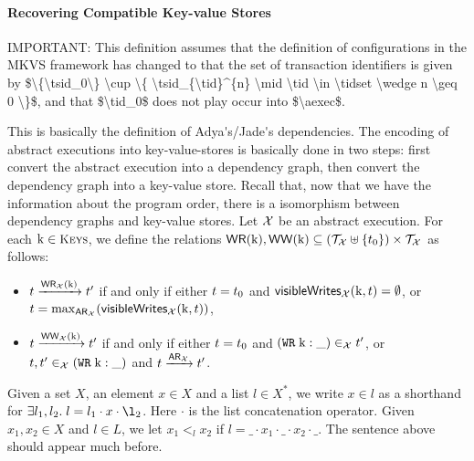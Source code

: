 \paragraph{Recovering Compatible Key-value Stores}
\ac{IMPORTANT: This definition assumes that the definition of configurations in the MKVS framework has changed 
to that the set of transaction identifiers is given by $\{\tsid_0\} \cup \{ \tsid_{\tid}^{n} \mid \tid \in \tidset \wedge n \geq 0 \}$, 
and that $\tid_0$ does not play occur into $\aexec$.}
%
\begin{definition}
\ac{This is basically the definition of Adya's/Jade's dependencies. The encoding 
of abstract executions into key-value-stores is basically done in two steps: first 
convert the abstract execution into a dependency graph, then convert the dependency graph 
into a key-value store. Recall that, now that we have the information about the program order, 
there is a isomorphism between dependency graphs and key-value stores.}
Let $\aexec$ be an abstract execution. For each $\key{k} \in \Addr$, 
we define the relations ${\mathsf{WR}}(\mathrm{k}), {\mathsf{WW}}(\mathrm{k}) \subseteq (\mathcal{T}_{\mathcal{X}} \uplus \{t_0\}) \times 
\mathcal{T}_{\mathcal{X}}$ as follows: 
\begin{itemize}
\item $t \xrightarrow{{\mathsf{WR}}_{\mathcal{X}}(\mathrm{k})} t'$ if and only if either $t = t_0$ and 
$\mathsf{visibleWrites}_{\mathcal{X}}(\mathrm{k}, t) = \emptyset$, or 
$t = \max_{{\sf{AR}}_{\mathcal{X}}}(\mathsf{visibleWrites}_{\mathcal{X}}(\mathrm{k}, t))$, 
\item $t \xrightarrow{{\mathsf{WW}}_{\mathcal{X}}(\mathrm{k})} t'$ if and only if either $t = t_0$ 
and $({{\tt WR}}\;\mathrm{k}: \_) \in_{\mathcal{X}} t'$, or $t, t' \in_{\mathcal{X}} ({{\tt WR}}\;\mathrm{k}: \_)$ 
and $t \xrightarrow{{\sf{AR}}_{\mathcal{X}}} t'$.
\end{itemize}
\end{definition}

Given a set $X$, an element $x \in X$ and a list $l \in X^{\ast}$, we write 
$x \in l$ as a shorthand for $\exists l_1, l_2. \; l = l_1 \cdot x \cdot \l_2$. 
Here $\cdot$ is the list concatenation operator. Given $x_1, x_2 \in X$ and 
$l \in L$, we let $x_1 <_{l} x_2$ if $l = \_ \cdot x_1 \cdot \_ \cdot x_2 \cdot \_$.
\ac{The sentence above should appear much before.}

